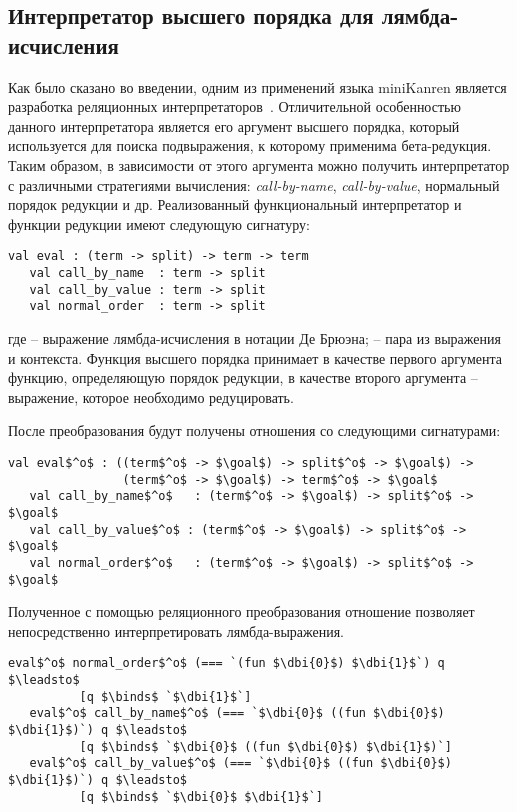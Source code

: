 \subsection{Интерпретатор высшего порядка для лямбда-исчисления}

Как было сказано во введении, одним из применений языка miniKanren является разработка реляционных интерпретаторов~\cite{lozov-spbu:quines,lozov-spbu:miniKanren,lozov-spbu:unified}. Отличительной особенностью данного интерпретатора является его аргумент высшего порядка, который используется для поиска подвыражения, к которому применима бета-редукция. Таким образом, в зависимости от этого аргумента можно получить интерпретатор с различными стратегиями вычисления: {\it call-by-name}, {\it call-by-value}, нормальный порядок редукции и др. Реализованный функциональный интерпретатор и функции редукции имеют следующую сигнатуру:

\begin{lstlisting}[basicstyle=\small]
   val eval : (term -> split) -> term -> term
   val call_by_name  : term -> split
   val call_by_value : term -> split
   val normal_order  : term -> split
\end{lstlisting}
где  -- выражение лямбда-исчисления в нотации Де Брюэна;  -- пара из выражения и контекста. Функция высшего порядка  принимает в качестве первого аргумента функцию, определяющую порядок редукции, в качестве второго аргумента -- выражение, которое необходимо редуцировать.

После преобразования будут получены отношения со следующими сигнатурами:
\begin{lstlisting}[basicstyle=\small]
   val eval$^o$ : ((term$^o$ -> $\goal$) -> split$^o$ -> $\goal$) ->
                (term$^o$ -> $\goal$) -> term$^o$ -> $\goal$
   val call_by_name$^o$   : (term$^o$ -> $\goal$) -> split$^o$ -> $\goal$
   val call_by_value$^o$ : (term$^o$ -> $\goal$) -> split$^o$ -> $\goal$
   val normal_order$^o$   : (term$^o$ -> $\goal$) -> split$^o$ -> $\goal$
\end{lstlisting}

Полученное с помощью реляционного преобразования отношение позволяет непосредственно интерпретировать лямбда-выражения.

\begin{lstlisting}[basicstyle=\small]
   eval$^o$ normal_order$^o$ (=== `(fun $\dbi{0}$) $\dbi{1}$`) q $\leadsto$
          [q $\binds$ `$\dbi{1}$`]
   eval$^o$ call_by_name$^o$ (=== `$\dbi{0}$ ((fun $\dbi{0}$) $\dbi{1}$)`) q $\leadsto$
          [q $\binds$ `$\dbi{0}$ ((fun $\dbi{0}$) $\dbi{1}$)`]
   eval$^o$ call_by_value$^o$ (=== `$\dbi{0}$ ((fun $\dbi{0}$) $\dbi{1}$)`) q $\leadsto$
          [q $\binds$ `$\dbi{0}$ $\dbi{1}$`]
\end{lstlisting}

